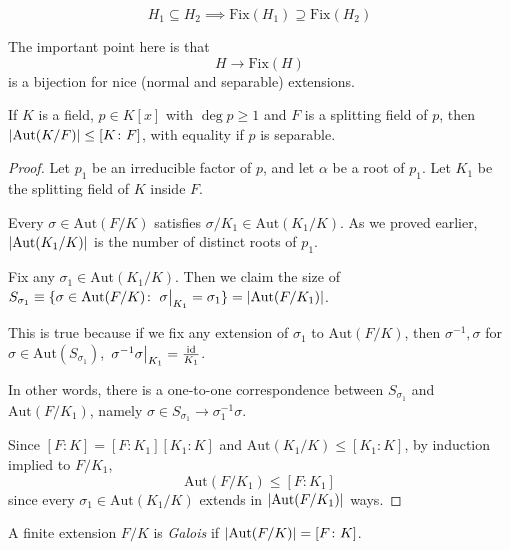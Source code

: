 \documentclass[a4paper,twoside,master.tex]{subfiles}
\begin{document}
\begin{equation}
    H_1 \subseteq H_2 \implies \text{Fix}(H_1) \supseteq \text{Fix}(H_2)
\end{equation}

The important point here is that
\begin{equation}
    H \to \text{Fix}(H)
\end{equation}
is a bijection for nice (normal and separable) extensions.

\begin{claim}
    If $ K $ is a field, $ p \in K[x] $ with $ \deg p \geq 1 $ and $ F $ is a splitting field of $ p $, then $ \abs{\text{Aut}(K/F)} \leq [K\colon F] $, with equality if $ p $ is separable.
\end{claim}
\begin{proof}
    Let $ p_1 $ be an irreducible factor of $ p $, and let $ \alpha $ be a root of $ p_1 $. Let $ K_1 $ be the splitting field of $ K $ inside $ F $.
    
    Every $ \sigma \in \text{Aut}(F/K) $ satisfies $ \sigma/K_1 \in \text{Aut}(K_1/K) $. As we proved earlier, $ \abs{\text{Aut}(K_1/K)} $ is the number of distinct roots of $ p_1 $.

    Fix any $ \sigma_1 \in \text{Aut}(K_1/K) $. Then we claim the size of $ S_{\sigma_1} \equiv \{\sigma \in \text{Aut}(F/K) \colon \eval{\sigma}_{K_1} = \sigma_1\} = \abs{\text{Aut}(F/K_1)} $.

    This is true because if we fix any extension of $ \sigma_1 $ to $ \text{Aut}(F/K) $, then $ \sigma^{-1}, \sigma $ for $ \sigma \in \text{Aut}(S_{\sigma_1}) $, $ \eval{\sigma^{-1} \sigma}_{K_1} = \frac{\text{id}}{K_1} $. 

    In other words, there is a one-to-one correspondence between $ S_{\sigma_1} $ and $ \text{Aut}(F/K_1) $, namely $ \sigma \in S_{\sigma_1} \to \sigma_1^{-1} \sigma $.

    Since $ [F\colon K]= [F\colon K_1][K_1\colon K] $ and $ \text{Aut}(K_1/K) \leq [K_1\colon K] $, by induction implied to $ F/K_1 $,
    \begin{equation}
        \text{Aut}(F/K_1) \leq [F\colon K_1]
    \end{equation}
    since every $ \sigma_1 \in \text{Aut}(K_1/K) $ extends in $ \abs{\text{Aut}(F/K_1)} $ ways.
\end{proof}

\begin{definition}
    A finite extension $ F/K $ is \textit{Galois} if $ \abs{\text{Aut}(F/K)} = [F\colon K] $.
\end{definition}
\end{document}
